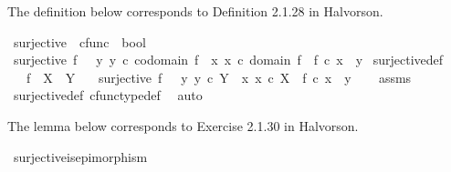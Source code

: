 \begin{isabellebody}
%
\endisatagproof
{\isafoldproof}%
%
\isadelimproof
%
\endisadelimproof
%
\isadelimdocument
%
\endisadelimdocument
%
\isatagdocument
%
\isamarkuptrue%
%
\endisatagdocument
{\isafolddocument}%
%
\isadelimdocument
%
\endisadelimdocument
%
\begin{isamarkuptext}%
The definition below corresponds to Definition 2.1.28 in Halvorson.%
\end{isamarkuptext}\isamarkuptrue%
\isamarkupfalse%
\ surjective\ {\isacharcolon}{\kern0pt}{\isacharcolon}{\kern0pt}\ {\isachardoublequoteopen}cfunc\ {\isasymRightarrow}\ bool{\isachardoublequoteclose}\ \isanewline
\ {\isachardoublequoteopen}surjective\ f\ \ {\isasymlongleftrightarrow}\ {\isacharparenleft}{\kern0pt}{\isasymforall}y{\isachardot}{\kern0pt}\ y\ {\isasymin}\isactrlsub c\ codomain\ f\ {\isasymlongrightarrow}\ {\isacharparenleft}{\kern0pt}{\isasymexists}x{\isachardot}{\kern0pt}\ x\ {\isasymin}\isactrlsub c\ domain\ f\ {\isasymand}\ f\ {\isasymcirc}\isactrlsub c\ x\ {\isacharequal}{\kern0pt}\ y{\isacharparenright}{\kern0pt}{\isacharparenright}{\kern0pt}{\isachardoublequoteclose}\isanewline
\isanewline
{}\isamarkupfalse%
\ surjective{\isacharunderscore}{\kern0pt}def{}{\isacharcolon}{\kern0pt}\isanewline
\ \ \ {\isachardoublequoteopen}f\ {\isacharcolon}{\kern0pt}\ X\ {\isasymrightarrow}\ Y{\isachardoublequoteclose}\isanewline
\ \ \ {\isachardoublequoteopen}surjective\ f\ \ {\isasymlongleftrightarrow}\ {\isacharparenleft}{\kern0pt}{\isasymforall}y{\isachardot}{\kern0pt}\ y\ {\isasymin}\isactrlsub c\ Y\ {\isasymlongrightarrow}\ {\isacharparenleft}{\kern0pt}{\isasymexists}x{\isachardot}{\kern0pt}\ x\ {\isasymin}\isactrlsub c\ X\ {\isasymand}\ f\ {\isasymcirc}\isactrlsub c\ x\ {\isacharequal}{\kern0pt}\ y{\isacharparenright}{\kern0pt}{\isacharparenright}{\kern0pt}{\isachardoublequoteclose}\isanewline
%
\isadelimproof
\ \ %
\endisadelimproof
%
\isatagproof
{}\isamarkupfalse%
\ assms\ \isamarkupfalse%
\ surjective{\isacharunderscore}{\kern0pt}def\ cfunc{\isacharunderscore}{\kern0pt}type{\isacharunderscore}{\kern0pt}def\ \isamarkupfalse%
\ auto%
\endisatagproof
{\isafoldproof}%
%
\isadelimproof
%
\endisadelimproof
%
\begin{isamarkuptext}%
The lemma below corresponds to Exercise 2.1.30 in Halvorson.%
\end{isamarkuptext}\isamarkuptrue%
\isamarkupfalse%
\ surjective{\isacharunderscore}{\kern0pt}is{\isacharunderscore}{\kern0pt}epimorphism{\isacharcolon}{\kern0pt}\isanewline

\end{isabellebody}
